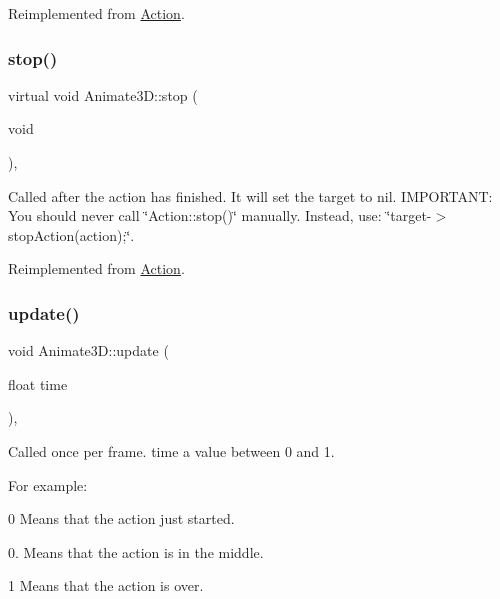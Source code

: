 Reimplemented from \hyperlink{classAction_a968267fa7a1dcc46a2976249a712d3c8}{Action}.

\mbox{\label{classAnimate3D_af37f00e045b7dc5cd1a0c54a4f4f8042}} 
\subsubsection{\texorpdfstring{stop()}{stop()}\hspace{0.1cm}{\footnotesize\ttfamily [2/2]}}
{\footnotesize\ttfamily virtual void Animate3\+D\+::stop (\begin{DoxyParamCaption}\item[{void}]{ }\end{DoxyParamCaption})\hspace{0.3cm}{\ttfamily [override]}, {\ttfamily [virtual]}}

Called after the action has finished. It will set the \textquotesingle{}target\textquotesingle{} to nil. I\+M\+P\+O\+R\+T\+A\+NT\+: You should never call \char`\"{}\+Action\+::stop()\char`\"{} manually. Instead, use\+: \char`\"{}target-\/$>$stop\+Action(action);\char`\"{}. 

Reimplemented from \hyperlink{classAction_a968267fa7a1dcc46a2976249a712d3c8}{Action}.

\mbox{\label{classAnimate3D_a03bc0bc8212147a742f059fc93361910}} 
\subsubsection{\texorpdfstring{update()}{update()}\hspace{0.1cm}{\footnotesize\ttfamily [1/2]}}
{\footnotesize\ttfamily void Animate3\+D\+::update (\begin{DoxyParamCaption}\item[{float}]{time }\end{DoxyParamCaption})\hspace{0.3cm}{\ttfamily [override]}, {\ttfamily [virtual]}}

Called once per frame. time a value between 0 and 1.

For example\+:
\begin{DoxyItemize}
\item 0 Means that the action just started.
\item 0. Means that the action is in the middle.
\item 1 Means that the action is over.
\end{DoxyItemize}


